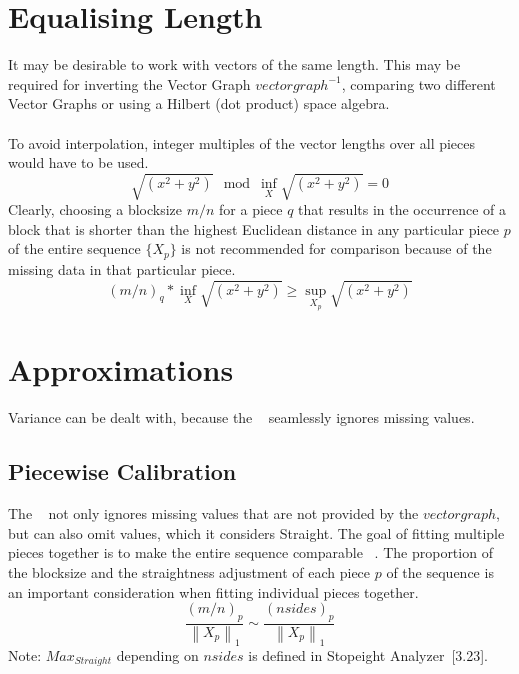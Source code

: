 \documentclass{report}
\newcommand\norm[1]{\left\lVert#1\right\rVert}
\begin{document}
\section{Equalising Length}
It may be desirable to work with vectors of the same length. This may be required for inverting the Vector Graph $vectorgraph^{-1}$, comparing two different Vector Graphs or using a Hilbert (dot product) space algebra.\\\\
To avoid interpolation, integer multiples of the vector lengths over all pieces would have to be used.
\begin{equation}
\sqrt{(x^2+y^2)} \mod \inf \limits _{X} \sqrt{(x^2+y^2)} = 0
\end{equation}
Clearly, choosing a blocksize $m/n$ for a piece $q$ that results in the occurrence of a block that is shorter than the highest Euclidean distance in any particular piece $p$ of the entire sequence $\{X_{p}\}$ is not recommended for comparison because of the missing data in that particular piece.
\begin{equation}
(m/n)_{q}*\inf \limits _{X} \sqrt{(x^2+y^2)} \geq \sup \limits _{X_{p}} \sqrt{(x^2+y^2)}\label{eq:4}
\end{equation}
\section{Approximations}
Variance can be dealt with, because the ~\cite[Stopeight\_Analyzer.tex]{Analyzer} seamlessly ignores missing values.
\subsection{Piecewise Calibration}
The ~\cite[Stopeight\_Analyzer.tex]{Analyzer} not only ignores missing values that are not provided by the $vectorgraph$, but can also omit values, which it considers Straight. The goal of fitting multiple pieces together is to make the entire sequence comparable ~\cite[Non-Orthogonal]{Comparator}. The proportion of the blocksize and the straightness adjustment of each piece $p$ of the sequence is an important consideration when fitting individual pieces together.
\begin{equation}
\frac{(m/n)_{p}}{\norm{X_{p}}_{1}} \sim \frac{(nsides)_{p}}{\norm{X_{p}}_{1}}
\end{equation}
Note: $Max_{Straight}$ depending on $nsides$ is defined in Stopeight Analyzer~\cite{Analyzer}[3.23].
\end{document}
